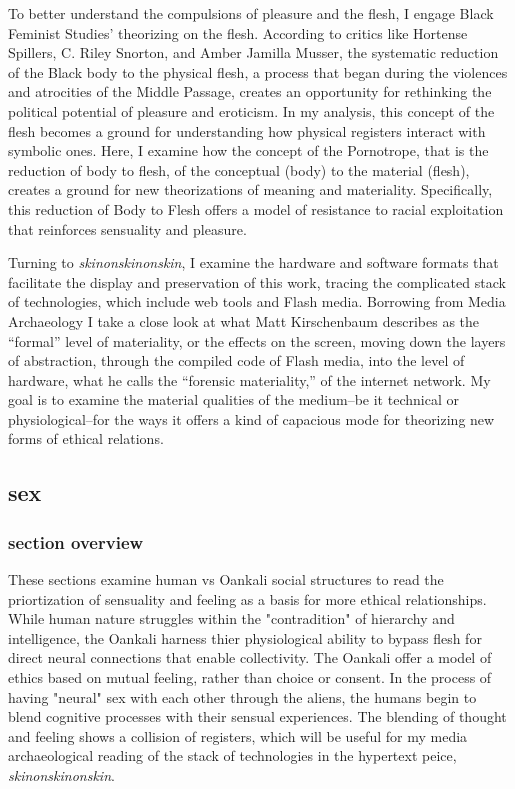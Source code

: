 \documentclass[11pt]{article}
\begin{document}
To better understand the compulsions of pleasure and the flesh, I
engage Black Feminist Studies’ theorizing on the flesh. According to
critics like Hortense Spillers, C. Riley Snorton, and Amber Jamilla
Musser, the systematic reduction of the Black body to the physical
flesh, a process that began during the violences and atrocities of the
Middle Passage, creates an opportunity for rethinking the political
potential of pleasure and eroticism. In my analysis, this concept of
the flesh becomes a ground for understanding how physical registers
interact with symbolic ones. Here, I examine how the concept of the
Pornotrope, that is the reduction of body to flesh, of the conceptual
(body) to the material (flesh), creates a ground for new theorizations
of meaning and materiality. Specifically, this reduction of Body to
Flesh offers a model of resistance to racial exploitation that
reinforces sensuality and pleasure.

Turning to \emph{skinonskinonskin}, I examine the hardware and software
formats that facilitate the display and preservation of this work,
tracing the complicated stack of technologies, which include web tools
and Flash media. Borrowing from Media Archaeology I take a close look
at what Matt Kirschenbaum describes as the “formal” level of
materiality, or the effects on the screen, moving down the layers of
abstraction, through the compiled code of Flash media, into the level
of hardware, what he calls the “forensic materiality,” of the internet
network. My goal is to examine the material qualities of the
medium--be it technical or physiological--for the ways it offers a
kind of capacious mode for theorizing new forms of ethical relations.


\subsection{sex}
\label{sec:org3eb9790}
\subsubsection{section overview}
\label{sec:org59c8411}
These sections examine human vs Oankali social structures to read the
priortization of sensuality and feeling as a basis for more ethical
relationships. While human nature struggles within the "contradition"
of hierarchy and intelligence, the Oankali harness thier physiological
ability to bypass flesh for direct neural connections that enable
collectivity. The Oankali offer a model of ethics based on mutual
feeling, rather than choice or consent. In the process of having
"neural" sex with each other through the aliens, the humans begin to
blend cognitive processes with their sensual experiences. The blending
of thought and feeling shows a collision of registers, which will be
useful for my media archaeological reading of the stack of
technologies in the hypertext peice, \emph{skinonskinonskin}.
\end{document}
